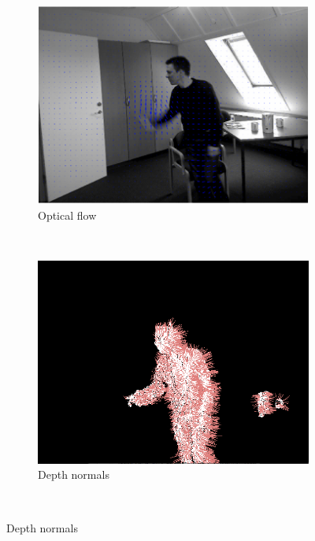 \documentclass[10pt,twocolumn,letterpaper]{article}
\begin{document}
\begin{figure}[ht]
	\center
        \begin{subfigure}[b]{0.33\textwidth}
                \includegraphics[width=\textwidth]{opticalflow_final.eps}
                \caption{Optical flow}
                \label{fig:opticalflow}
        \end{subfigure}\,
        \begin{subfigure}[b]{0.32\textwidth}
                \includegraphics[width=\textwidth]{normals.png}
                \caption{Depth normals}
                \label{fig:normals}
        \end{subfigure}\,

\end{figure}
\end{document}
